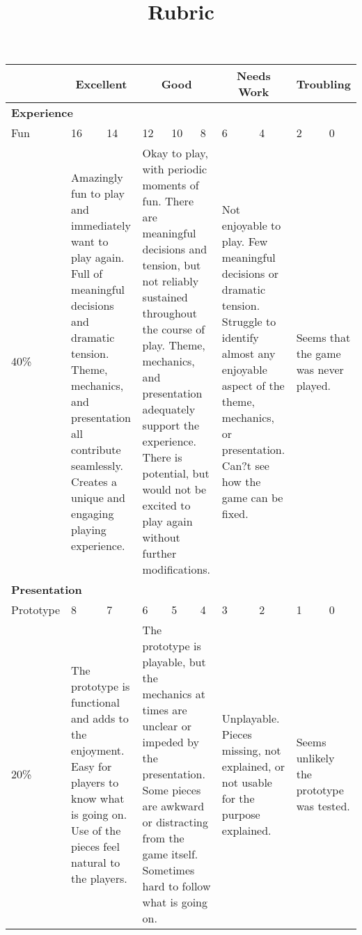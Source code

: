 \documentclass{article}
\title{Rubric}
\begin{document}
\thispagestyle{empty}

\begin{table}[t]
\label{tab:myTable}
\begin{center}
\begin{tabular}{ l | *{9}{p{.1\linewidth}|}}
 & \multicolumn{2}{c}{Excellent} 
 & \multicolumn{3}{c}{Good} 
 & \multicolumn{2}{c}{Needs Work}
 & \multicolumn{2}{c}{Troubling} \\\hline
\multicolumn{10}{l}{\bf Experience} \\\hline
Fun &  16 & 14 & 12 & 10 & 8 & 6 & 4 & 2 & 0\\ \hline
40\% 
	& \multicolumn{2}{p{.2\linewidth}|}{Amazingly fun to play and immediately want to play again. Full of meaningful decisions and dramatic tension. Theme, mechanics, and presentation all contribute seamlessly. Creates a unique and engaging playing experience. }
	& \multicolumn{3}{p{.3\linewidth}|}{Okay to play, with periodic moments of fun. There are meaningful decisions and tension, but not reliably sustained throughout the course of play. Theme, mechanics, and presentation adequately support the experience. There is potential, but would not be excited to play again without further modifications.}
	& \multicolumn{2}{p{.2\linewidth}|}{Not enjoyable to play. Few meaningful decisions or dramatic tension. Struggle to identify almost any enjoyable aspect of the theme, mechanics, or presentation. Can?t see how the game can be fixed.}
	& \multicolumn{2}{p{.1\linewidth}}{Seems that the game was never played. }\\\hline
\multicolumn{10}{l}{{\bf Presentation}}\\\hline
Prototype & 8 & 7 & 6 & 5 & 4 & 3 & 2 & 1 & 0\\\hline
20\% 
	& \multicolumn{2}{p{.1\linewidth}|}{The prototype is functional and adds to the enjoyment. Easy for players to know what is going on. Use of the pieces feel natural to the players.}
	& \multicolumn{3}{p{.1\linewidth}|}{The prototype is playable, but the mechanics at times are unclear or impeded by the presentation. Some pieces are awkward or distracting from the game itself. Sometimes hard to follow what is going on.}
	& \multicolumn{2}{p{.1\linewidth}|}{Unplayable. Pieces missing, not explained, or not usable for the purpose explained.}
	& \multicolumn{2}{p{.1\linewidth}}{Seems unlikely the prototype was tested.}\\\hline

\end{tabular}
\end{center}
\end{table}
\end{document}
